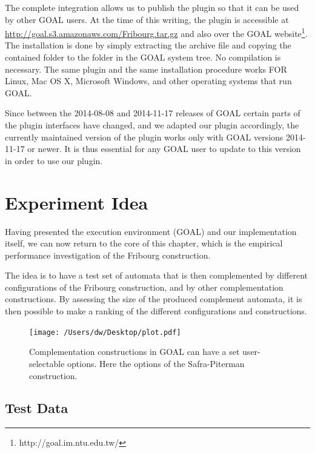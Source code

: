 The complete integration allows us to publish the plugin so that it can be used by other GOAL users. At the time of this writing, the plugin is accessible at \url{http://goal.s3.amazonaws.com/Fribourg.tar.gz} and also over the GOAL website\footnote{http://goal.im.ntu.edu.tw/}. The installation is done by simply extracting the archive file and copying the contained folder to the  folder in the GOAL system tree. No compilation is necessary. The same plugin and the same installation procedure works FOR Linux, Mac OS X, Microsoft Windows, and other operating systems that run GOAL.

Since between the 2014-08-08 and 2014-11-17 releases of GOAL certain parts of the plugin interfaces have changed, and we adapted our plugin accordingly, the currently maintained version of the plugin works only with GOAL versions 2014-11-17 or newer. It is thus essential for any GOAL user to update to this version in order to use our plugin.


\section{Experiment Idea}
\label{experiment_idea}
Having presented the execution environment (GOAL) and our implementation itself, we can now return to the core of this chapter, which is the empirical performance investigation of the Fribourg construction.

The idea is to have a test set of automata that is then complemented by different configurations of the Fribourg construction, and by other complementation constructions. By assessing the size of the produced complement automata, it is then possible to make a ranking of the different configurations and constructions.

\begin{figure}
\begin{center}
\texttt{[image: /Users/dw/Desktop/plot.pdf]}
\caption{\textsf{Complementation constructions in GOAL can have a set user-selectable options. Here the options of the Safra-Piterman construction.}}
\label{goal_complementation_options}
\end{center}
\end{figure}

\begin{center}

\end{center}

\subsection{Test Data}

